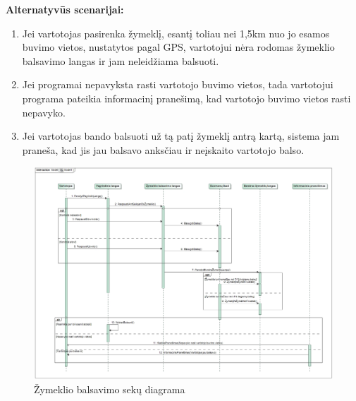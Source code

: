 \documentclass{VUMIFPSkursinis}
\begin{document}
	\textbf{Alternatyvūs scenarijai:}
	\begin{enumerate}[itemsep=-2mm]
		\item Jei vartotojas pasirenka žymeklį, esantį toliau nei 1,5km nuo jo esamos buvimo vietos, nustatytos pagal GPS, vartotojui nėra rodomas žymeklio balsavimo langas ir jam neleidžiama balsuoti.
		\item Jei programai nepavyksta rasti vartotojo buvimo vietos, tada vartotojui programa pateikia informacinį pranešimą, kad vartotojo buvimo vietos rasti nepavyko.
		\item Jei vartotojas bando balsuoti už tą patį žymeklį antrą kartą, sistema jam praneša, kad jis jau balsavo anksčiau ir neįskaito vartotojo balso.
	\end{enumerate} 
		\begin{figure}[H]
				\centering
				\includegraphics[scale=0.35]{img/VoteSequence}
				\caption{Žymeklio balsavimo sekų diagrama}
				\label{img:Žymeklio informacijos RD}
			\end{figure}
\end{document}
